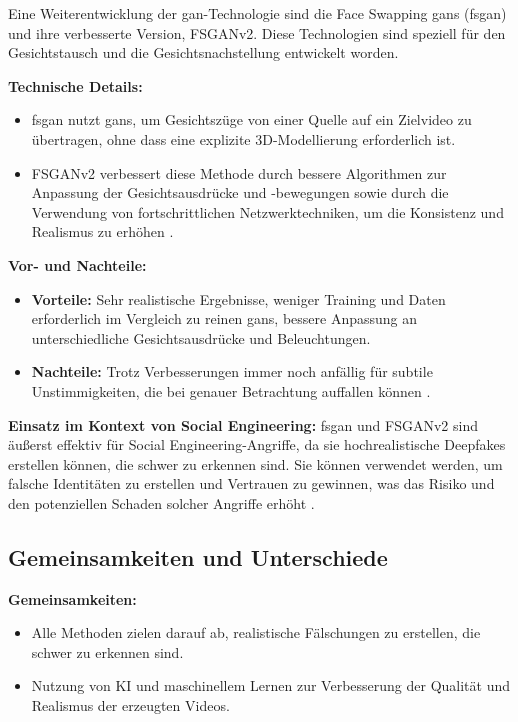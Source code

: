 Eine Weiterentwicklung der \gls{gan}-Technologie sind die Face Swapping \glspl{gan} (\gls{fsgan}) und ihre verbesserte Version, FSGANv2.
Diese Technologien sind speziell für den Gesichtstausch und die Gesichtsnachstellung entwickelt worden.

\textbf{Technische Details:}
\begin{itemize}
    \item \gls{fsgan} nutzt \glspl{gan}, um Gesichtszüge von einer Quelle auf ein Zielvideo zu übertragen, ohne dass eine explizite 3D-Modellierung erforderlich ist.
    \item FSGANv2 verbessert diese Methode durch bessere Algorithmen zur Anpassung der Gesichtsausdrücke und -bewegungen sowie durch die Verwendung von fortschrittlichen Netzwerktechniken, um die Konsistenz und Realismus zu erhöhen \cite{fsganv2}.
\end{itemize}

\textbf{Vor- und Nachteile:}
\begin{itemize}
    \item \textbf{Vorteile:} Sehr realistische Ergebnisse, weniger Training und Daten erforderlich im Vergleich zu reinen \glspl{gan}, bessere Anpassung an unterschiedliche Gesichtsausdrücke und Beleuchtungen.
    \item \textbf{Nachteile:} Trotz Verbesserungen immer noch anfällig für subtile Unstimmigkeiten, die bei genauer Betrachtung auffallen können \cite{face-swapping-and-reenactment}.
\end{itemize}

\textbf{Einsatz im Kontext von Social Engineering:} \gls{fsgan} und FSGANv2 sind äußerst effektiv für Social Engineering-Angriffe, da sie hochrealistische Deepfakes erstellen können, die schwer zu erkennen sind.
Sie können verwendet werden, um falsche Identitäten zu erstellen und Vertrauen zu gewinnen, was das Risiko und den potenziellen Schaden solcher Angriffe erhöht \cite{deepfacelab}.

\subsection{Gemeinsamkeiten und Unterschiede}\label{subsec:gemeinsamkeiten-unterschiede}

\textbf{Gemeinsamkeiten:}
\begin{itemize}
    \item Alle Methoden zielen darauf ab, realistische Fälschungen zu erstellen, die schwer zu erkennen sind.
    \item Nutzung von KI und maschinellem Lernen zur Verbesserung der Qualität und Realismus der erzeugten Videos.
\end{itemize}

